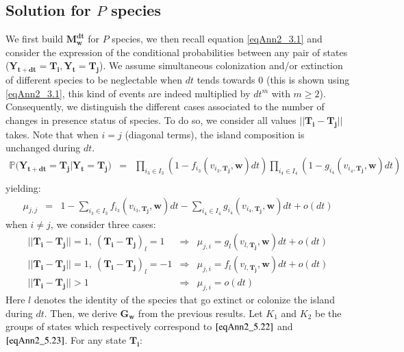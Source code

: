 \subsection{Solution for $P$ species}

We first build $\mathbf{M_w^{dt}}$ for $P$ species, we then recall equation \eqref{eqAnn2_3.1} and consider the expression of the conditional probabilities between any pair of states ($\mathbf{Y_{t+dt}}=\mathbf{T_i},\mathbf{Y_t}=\mathbf{T_j}$).
We assume simultaneous colonization and/or extinction of different species to be neglectable when $dt$ tends towards 0 (this is shown using \eqref{eqAnn2_3.1}, this kind of events are indeed multiplied by $dt^m$ with $m\geqslant2$). Consequently, we distinguish the different cases associated to the number of changes in presence status of species. To do so, we consider all values $||\mathbf{T_i}-\mathbf{T_j}||$ takes. Note that when $i=j$ (diagonal terms), the island composition is unchanged during $dt$.
\begin{eqnarray}
\nonumber \mathbb{P}(\mathbf{Y_{t+dt}=\mathbf{T_j} | \mathbf{Y_{t}=\mathbf{T_j})}} &=& \prod_{i_3 \in I_3}(1-f_{i_3}(v_{i_3,\mathbf{T_j}}, \mathbf{w})dt)\prod_{i_4 \in I_4}(1-g_{i_4}(v_{i_4,\mathbf{T_j}}, \mathbf{w})dt) \\
& &
\end{eqnarray}
yielding:
\begin{eqnarray}
\mu_{j,j} &=& 1-\sum_{i_3 \in I_3}f_{i_3}(v_{i_3,\mathbf{T_j}}, \mathbf{w})dt- \sum_{i_4 \in I_4}g_{i_4}(v_{i_4,\mathbf{T_j}}, \mathbf{w})dt+o(dt)
\end{eqnarray}
when $i\neq j$, we consider three cases:
\begin{eqnarray}
\label{eqAnn2_5.22} ||\mathbf{T_i}-\mathbf{T_j}|| = 1, ~(\mathbf{T_i}-\mathbf{T_j})_l=1 &\Rightarrow& \mu_{j,i}= g_l(v_{l,\mathbf{T_j}}, \mathbf{w})dt+ o(dt) \\
\label{eqAnn2_5.23} ||\mathbf{T_i}-\mathbf{T_j}||  =1  , ~(\mathbf{T_i}-\mathbf{T_j})_l=-1 &\Rightarrow& \mu_{j,i}= f_l(v_{l,\mathbf{T_j}}, \mathbf{w})dt+o(dt) \\
||\mathbf{T_i}-\mathbf{T_j}||  >1 &\Rightarrow& \mu_{j,i}=o(dt)
\end{eqnarray}
Here $l$ denotes the identity of the species that go extinct or colonize the island during $dt$. Then, we derive $\mathbf{G_w}$ from the previous results. Let $K_1$ and $K_2$ be the groups of states which respectively correspond to $\eqref{eqAnn2_5.22}$ and $\eqref{eqAnn2_5.23}$. For any state $\mathbf{T_i}$:
